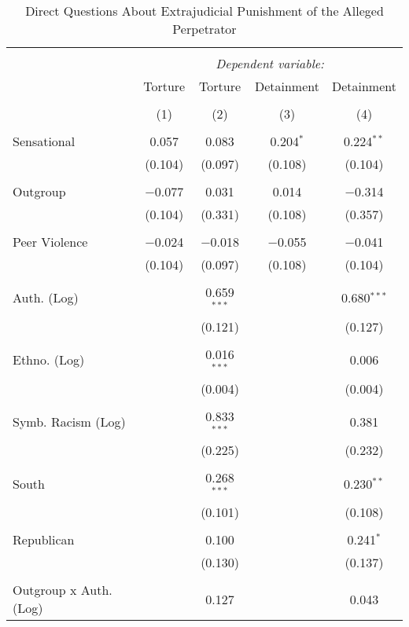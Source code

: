 
\begin{table}[H] \centering 
  \caption{Direct Questions About Extrajudicial Punishment of the Alleged Perpetrator} 
  \label{} 
\begin{tabular}{@{\extracolsep{5pt}}lcccc} 
\\[-1.8ex]\hline 
\hline \\[-1.8ex] 
 & \multicolumn{4}{c}{\textit{Dependent variable:}} \\ 
\cline{2-5} 
 & Torture & Torture & Detainment & Detainment \\ 
\\[-1.8ex] & (1) & (2) & (3) & (4)\\ 
\hline \\[-1.8ex] 
 Sensational & 0.057 & 0.083 & 0.204$^{*}$ & 0.224$^{**}$ \\ 
  & (0.104) & (0.097) & (0.108) & (0.104) \\ 
  & & & & \\ 
 Outgroup & $-$0.077 & 0.031 & 0.014 & $-$0.314 \\ 
  & (0.104) & (0.331) & (0.108) & (0.357) \\ 
  & & & & \\ 
 Peer Violence & $-$0.024 & $-$0.018 & $-$0.055 & $-$0.041 \\ 
  & (0.104) & (0.097) & (0.108) & (0.104) \\ 
  & & & & \\ 
 Auth. (Log) &  & 0.659$^{***}$ &  & 0.680$^{***}$ \\ 
  &  & (0.121) &  & (0.127) \\ 
  & & & & \\ 
 Ethno. (Log) &  & 0.016$^{***}$ &  & 0.006 \\ 
  &  & (0.004) &  & (0.004) \\ 
  & & & & \\ 
 Symb. Racism (Log) &  & 0.833$^{***}$ &  & 0.381 \\ 
  &  & (0.225) &  & (0.232) \\ 
  & & & & \\ 
 South &  & 0.268$^{***}$ &  & 0.230$^{**}$ \\ 
  &  & (0.101) &  & (0.108) \\ 
  & & & & \\ 
 Republican &  & 0.100 &  & 0.241$^{*}$ \\ 
  &  & (0.130) &  & (0.137) \\ 
  & & & & \\ 
 Outgroup x Auth. (Log) &  & 0.127 &  & 0.043 \\ 

\end{tabular}
\end{table}
